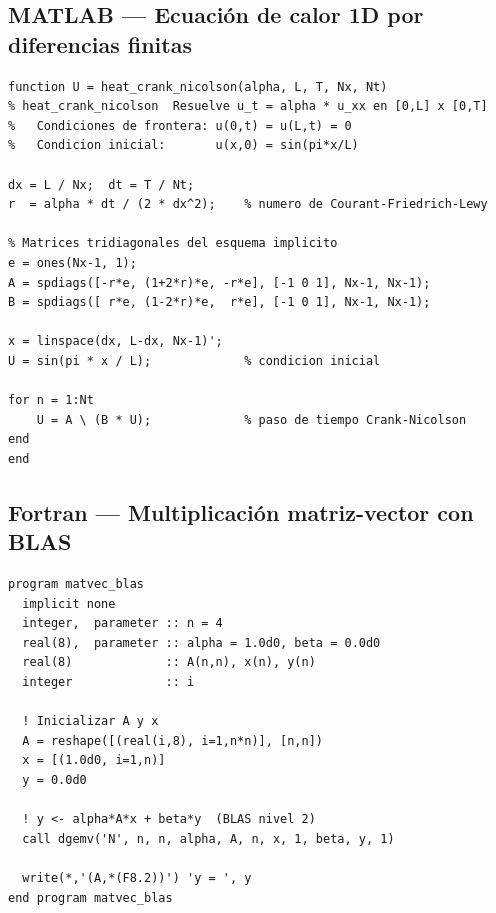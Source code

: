 \subsection{MATLAB — Ecuación de calor 1D por diferencias finitas}
\label{subsec:matlab}

\begin{lstlisting}[style=matlab,
  caption={Ecuación de calor 1D: esquema de Crank-Nicolson [LeVeque 2007]},
  label={lst:heat-matlab}]
function U = heat_crank_nicolson(alpha, L, T, Nx, Nt)
% heat_crank_nicolson  Resuelve u_t = alpha * u_xx en [0,L] x [0,T]
%   Condiciones de frontera: u(0,t) = u(L,t) = 0
%   Condicion inicial:       u(x,0) = sin(pi*x/L)

dx = L / Nx;  dt = T / Nt;
r  = alpha * dt / (2 * dx^2);    % numero de Courant-Friedrich-Lewy

% Matrices tridiagonales del esquema implicito
e = ones(Nx-1, 1);
A = spdiags([-r*e, (1+2*r)*e, -r*e], [-1 0 1], Nx-1, Nx-1);
B = spdiags([ r*e, (1-2*r)*e,  r*e], [-1 0 1], Nx-1, Nx-1);

x = linspace(dx, L-dx, Nx-1)';
U = sin(pi * x / L);             % condicion inicial

for n = 1:Nt
    U = A \ (B * U);             % paso de tiempo Crank-Nicolson
end
end
\end{lstlisting}

\subsection{Fortran — Multiplicación matriz-vector con BLAS}
\label{subsec:fortran}

\begin{lstlisting}[style=fortran,
  caption={Llamada a \texttt{dgemv} de BLAS para $\eqvec{\mathbf{y}} \leftarrow \alpha\eqten{A}\eqvec{\mathbf{x}} + \beta\eqvec{\mathbf{y}}$},
  label={lst:blas-fortran}]
program matvec_blas
  implicit none
  integer,  parameter :: n = 4
  real(8),  parameter :: alpha = 1.0d0, beta = 0.0d0
  real(8)             :: A(n,n), x(n), y(n)
  integer             :: i

  ! Inicializar A y x
  A = reshape([(real(i,8), i=1,n*n)], [n,n])
  x = [(1.0d0, i=1,n)]
  y = 0.0d0

  ! y <- alpha*A*x + beta*y  (BLAS nivel 2)
  call dgemv('N', n, n, alpha, A, n, x, 1, beta, y, 1)

  write(*,'(A,*(F8.2))') 'y = ', y
end program matvec_blas
\end{lstlisting}

